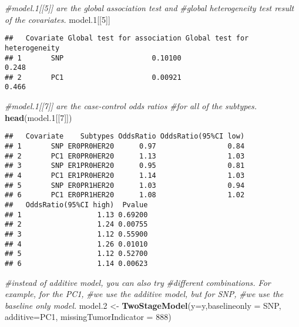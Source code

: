 \documentclass[11pt,]{article}
\newenvironment{Shaded}{\begin{snugshade}}{\end{snugshade}}
\newcommand{\CommentTok}[1]{\textcolor[rgb]{0.56,0.35,0.01}{\textit{#1}}}
\newcommand{\DataTypeTok}[1]{\textcolor[rgb]{0.13,0.29,0.53}{#1}}
\newcommand{\DecValTok}[1]{\textcolor[rgb]{0.00,0.00,0.81}{#1}}
\newcommand{\FloatTok}[1]{\textcolor[rgb]{0.00,0.00,0.81}{#1}}
\newcommand{\KeywordTok}[1]{\textcolor[rgb]{0.13,0.29,0.53}{\textbf{#1}}}
\newcommand{\NormalTok}[1]{#1}
\newcommand{\StringTok}[1]{\textcolor[rgb]{0.31,0.60,0.02}{#1}}
\begin{document}
\begin{Shaded}
\begin{Highlighting}[]
\CommentTok{#model.1[[5]] are the global association test and }
\CommentTok{#global heterogeneity test result of the covariates.}
\NormalTok{model}\FloatTok{.1}\NormalTok{[[}\DecValTok{5}\NormalTok{]]}
\end{Highlighting}
\end{Shaded}

\begin{verbatim}
##   Covariate Global test for association Global test for heterogeneity
## 1       SNP                     0.10100                         0.248
## 2       PC1                     0.00921                         0.466
\end{verbatim}

\begin{Shaded}
\begin{Highlighting}[]
\CommentTok{#model.1[[7]] are the case-control odds ratios }
\CommentTok{#for all of the subtypes.}
\KeywordTok{head}\NormalTok{(model}\FloatTok{.1}\NormalTok{[[}\DecValTok{7}\NormalTok{]])}
\end{Highlighting}
\end{Shaded}

\begin{verbatim}
##   Covariate    Subtypes OddsRatio OddsRatio(95%CI low)
## 1       SNP ER0PR0HER20      0.97                 0.84
## 2       PC1 ER0PR0HER20      1.13                 1.03
## 3       SNP ER1PR0HER20      0.95                 0.81
## 4       PC1 ER1PR0HER20      1.14                 1.03
## 5       SNP ER0PR1HER20      1.03                 0.94
## 6       PC1 ER0PR1HER20      1.08                 1.02
##   OddsRatio(95%CI high)  Pvalue
## 1                  1.13 0.69200
## 2                  1.24 0.00755
## 3                  1.12 0.55900
## 4                  1.26 0.01010
## 5                  1.12 0.52700
## 6                  1.14 0.00623
\end{verbatim}

\begin{Shaded}
\begin{Highlighting}[]
\CommentTok{#instead of additive model, you can also try }
\CommentTok{#different combinations. For example, for the PC1,}
\CommentTok{#we use the additive model, but for SNP,}
\CommentTok{#we use the baseline only model.}
\NormalTok{model}\FloatTok{.2}\NormalTok{ <-}\StringTok{ }\KeywordTok{TwoStageModel}\NormalTok{(}\DataTypeTok{y=}\NormalTok{y,}\DataTypeTok{baselineonly =}\NormalTok{ SNP,}
                         \DataTypeTok{additive=}\NormalTok{PC1,}
                         \DataTypeTok{missingTumorIndicator =} \DecValTok{888}\NormalTok{)}
\end{Highlighting}
\end{Shaded}
\end{document}
